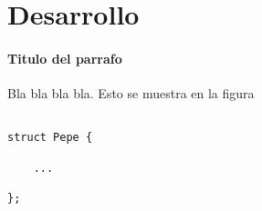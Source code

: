 \section{Desarrollo}


\paragraph{\textbf{Titulo del parrafo} } Bla bla bla bla.
Esto se muestra en la figura



\begin{codesnippet}
\begin{verbatim}

struct Pepe {

    ...

};

\end{verbatim}
\end{codesnippet}